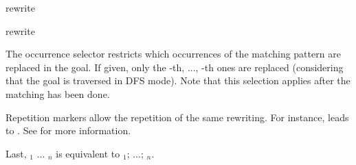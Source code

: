 \begin{tactic}{rewrite}
\begin{tsyntax}[empty]{rewrite}
    \smallskip
    
    The occurrence selector  restricts which occurrences
    of the matching pattern are replaced in the goal. If given, only the
    -th, ..., -th ones are replaced (considering that the goal is
    traversed in DFS mode). Note that this selection applies after the matching has
    been done.
    
    \medskip
    
    Repetition markers allow the repetition of the same rewriting. For instance,
     leads to . See  for
    more information.
    
    \medskip

    Last,  ${}_1$ ... ${}_n$ is equivalent to
     ${}_1$; ...;  ${}_n$.
  \end{tsyntax}
\end{tactic}
